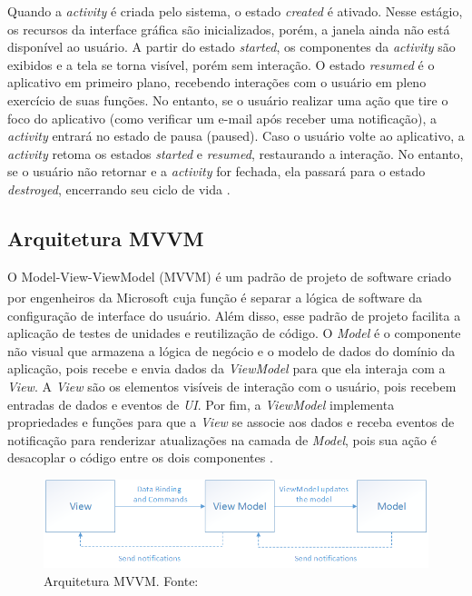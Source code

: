 Quando a \textit{activity} é criada pelo sistema, o estado \textit{created} é ativado. Nesse estágio, os recursos da interface gráfica 
são inicializados, porém, a janela ainda não está disponível ao usuário. A partir do estado \textit{started}, os componentes da \textit{activity} são exibidos e a tela se torna visível, porém sem interação.
O estado \textit{resumed} é o aplicativo em primeiro plano, recebendo interações com o usuário em pleno exercício de suas funções. No entanto, se o usuário realizar uma ação que tire 
o foco do aplicativo (como verificar um e-mail após receber uma notificação), a \textit{activity} entrará no estado de pausa (paused).
Caso o usuário volte ao aplicativo, a \textit{activity} retoma os estados \textit{started} e \textit{resumed}, restaurando a interação. No entanto, se o usuário não retornar e a \textit{activity} for fechada, 
ela passará para o estado \textit{destroyed}, encerrando seu ciclo de vida \cite{google-developers-activity-lifecycle}.

\subsection{Arquitetura MVVM}

O Model-View-ViewModel (MVVM) é um padrão de projeto de software criado por engenheiros da Microsoft\textsuperscript{\textregistered} 
cuja função é separar a lógica de software da configuração de interface do usuário. Além disso, esse padrão de projeto facilita a aplicação de testes de unidades e reutilização 
de código. O \textit{Model} é o componente não visual que armazena a lógica de negócio e o modelo de dados do domínio da aplicação, pois recebe e envia dados da \textit{ViewModel} 
para que ela interaja com a \textit{View}. A \textit{View} são os elementos visíveis de interação com o usuário, pois recebem entradas de dados e eventos de \textit{UI}. Por fim, a
\textit{ViewModel} implementa propriedades e funções para que a \textit{View} se associe aos dados e receba eventos de notificação para renderizar atualizações na camada de \textit{Model}, pois
sua ação é desacoplar o código entre os dois componentes \cite{mvvm-documentation}.

\begin{figure}[ht]
    \centering
    \includegraphics[width=.87\textwidth]{img/mvvm-pattern.png}
    \caption{Arquitetura MVVM. Fonte: \cite{mvvm-documentation}}\label{figMVVM}
\end{figure}

